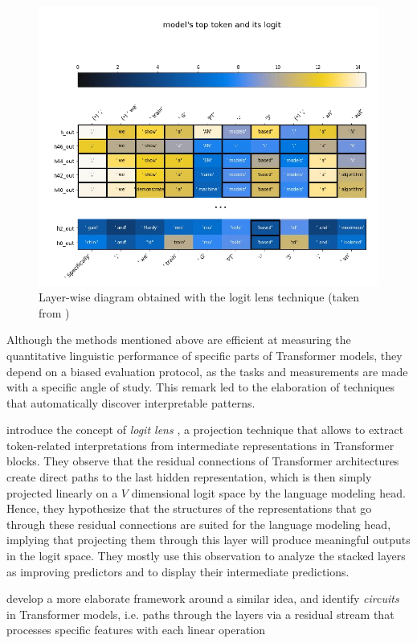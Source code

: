 \begin{figure}[ht]
    \centering
    \includegraphics[width=0.7\linewidth]{sources/related_works/imgs/logit_lens.pdf}
    \caption{Layer-wise diagram obtained with the logit lens technique (taken from \citet{logit_lens})}
    \label{fig:probing}
\end{figure}

Although the methods mentioned above are efficient at measuring the quantitative linguistic performance of specific parts of Transformer models, they depend on a biased evaluation protocol, as the tasks and measurements are made with a specific angle of study. This remark led to the elaboration of techniques that automatically discover interpretable patterns.

\citet{logit_lens} introduce the concept of \textit{logit lens} \citep{logit_lens}, a projection technique that allows to extract token-related interpretations from intermediate representations in Transformer blocks. They observe that the residual connections of Transformer architectures create direct paths to the last hidden representation, which is then simply projected linearly on a $V$ dimensional logit space by the language modeling head. Hence, they hypothesize that the structures of the representations that go through these residual connections are suited for the language modeling head, implying that projecting them through this layer will produce meaningful outputs in the logit space. They mostly use this observation to analyze the stacked layers as improving predictors and to display their intermediate predictions.

\citet{elhage2021mathematical} develop a more elaborate framework around a similar idea, and identify \textit{circuits} in Transformer models, i.e. paths through the layers via a residual stream that processes specific features with each linear operation

